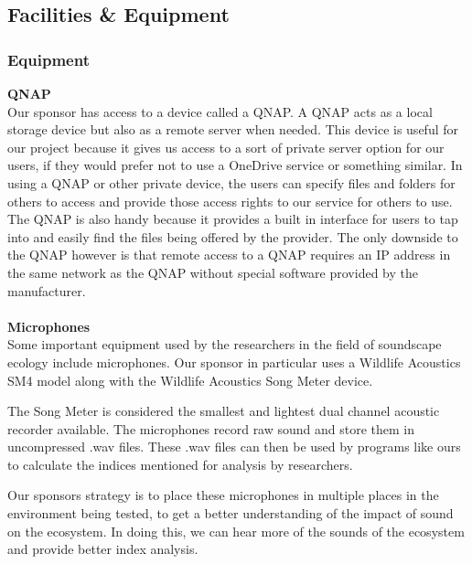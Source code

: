 \subsection{Facilities \& Equipment}
\subsubsection{Equipment}
\textbf{QNAP}\\
Our sponsor has access to a device called a QNAP. A QNAP acts as a local storage device but also as a remote server when needed. This device is useful for our project because it gives us access to a sort of private server option for our users, if they would prefer not to use a OneDrive service or something similar. In using a QNAP or other private device, the users can specify files and folders for others to access and provide those access rights to our service for others to use. The QNAP is also handy because it provides a built in interface for users to tap into and easily find the files being offered by the provider. The only downside to the QNAP however is that remote access to a QNAP requires an IP address in the same network as the QNAP without special software provided by the manufacturer.\\\\
\textbf{Microphones}\\
Some important equipment used by the researchers in the field of soundscape ecology include microphones. Our sponsor in particular uses a Wildlife Acoustics SM4 model along with the Wildlife Acoustics Song Meter device.\par
The Song Meter is considered the smallest and lightest dual channel acoustic recorder available\cite{songmeter}. The microphones record raw sound and store them in uncompressed .wav files. These .wav files can then be used by programs like ours to calculate the indices mentioned for analysis by researchers.\par
Our sponsor\textquotesingle s strategy is to place these microphones in multiple places in the environment being tested, to get a better understanding of the impact of sound on the ecosystem. In doing this, we can hear more of the sounds of the ecosystem and provide better index analysis.\par


